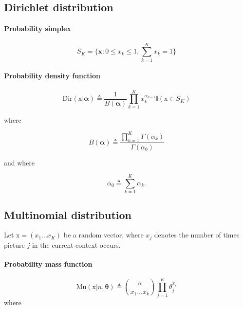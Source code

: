 \documentclass[a4paper,12pt]{article} 			%
\begin{document}
\subsection*{Dirichlet distribution}

\paragraph*{Probability simplex}

\begin{equation}
S_K = \{\mathbf{x} : 0\le x_k \le 1, \sum^K_{k=1}x_k=1\}
\end{equation}

\paragraph*{Probability density function}

\begin{equation}
\mathrm{Dir}(\boldsymbol{\mathrm{x}}|\boldsymbol{\alpha}) \triangleq \dfrac{1}{B(\mathbf{\boldsymbol\alpha})} \prod^K_{k=1}x_k^{\alpha_{k-1}}\mathbb{I}(\boldsymbol{\mathrm{x}}\in S_K)	
\end{equation}

where

\begin{equation}
B(\boldsymbol{\alpha}) \triangleq \dfrac{\prod_{k=1}^K \Gamma(\alpha_k)}{\Gamma(\alpha_0)} 	
\end{equation}

and where


\begin{equation}
\alpha_0 \triangleq \sum_{k=1}^K\alpha_k.
\end{equation}


\subsection*{Multinomial distribution}

Let $\boldsymbol{\mathrm{x}}=(x_1...x_K)$ be a random vector, where $x_j$ denotes the number of times picture $j$ in the current context occurs.

\paragraph*{Probability mass function}

\begin{equation}
\mathrm{Mu}(\boldsymbol{\mathrm{x}}|n,\boldsymbol{\theta}) \triangleq \binom{n}{x_1...x_k} \prod^{K}_{j=1}\theta_j^{x_j}
\end{equation}
where
\end{document}
